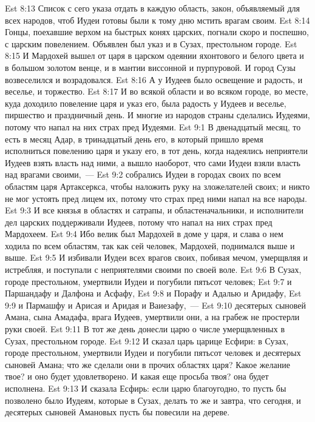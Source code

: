 \vs Est 8:13 Список с сего указа отдать в каждую область,  закон, объявляемый для всех народов, чтоб Иудеи готовы были к тому дню мстить врагам своим.
\vs Est 8:14 Гонцы, поехавшие верхом на быстрых конях царских, погнали скоро и поспешно, с царским повелением. Объявлен был указ и в Сузах, престольном городе.
\vs Est 8:15 И Мардохей вышел от царя в царском одеянии яхонтового и белого цвета и в большом золотом венце, и в мантии виссонной и пурпуровой. И город Сузы возвеселился и возрадовался.
\vs Est 8:16 А у Иудеев было  освещение и радость, и веселье, и торжество.
\vs Est 8:17 И во всякой области и во всяком городе, во  месте, куда  доходило повеление царя и указ его, была радость у Иудеев и веселье, пиршество и праздничный день. И многие из народов страны сделались Иудеями, потому что напал на них страх пред Иудеями.
\vs Est 9:1 В двенадцатый месяц, то есть в месяц Адар, в тринадцатый день его, в который пришло время исполниться повелению царя и указу его, в тот день, когда надеялись неприятели Иудеев взять власть над ними, а вышло наоборот, что сами Иудеи взяли власть над врагами своими,~---
\vs Est 9:2 собрались Иудеи в городах своих по всем областям царя Артаксеркса, чтобы наложить руку на зложелателей своих; и никто не мог устоять пред лицем их, потому что страх пред ними напал на все народы.
\vs Est 9:3 И все князья в областях и сатрапы, и областеначальники, и исполнители дел царских поддерживали Иудеев, потому что напал на них страх пред Мардохеем.
\vs Est 9:4 Ибо велик был Мардохей в доме у царя, и слава о нем ходила по всем областям, так как сей человек, Мардохей, поднимался выше и выше.
\rsbpar\vs Est 9:5 И избивали Иудеи всех врагов своих, побивая мечом, умерщвляя и истребляя, и поступали с неприятелями своими по своей воле.
\vs Est 9:6 В Сузах, городе престольном, умертвили Иудеи и погубили пятьсот человек;
\vs Est 9:7 и Паршандафу и Далфона и Асфафу,
\vs Est 9:8 и Порафу и Адалью и Аридафу,
\vs Est 9:9 и Пармашфу и Арисая и Аридая и Ваиезафу,~---
\vs Est 9:10 десятерых сыновей Амана, сына Амадафа, врага Иудеев, умертвили они, а на грабеж не простерли руки своей.
\vs Est 9:11 В тот же день донесли царю о числе умерщвленных в Сузах, престольном городе.
\vs Est 9:12 И сказал царь царице Есфири: в Сузах, городе престольном, умертвили Иудеи и погубили пятьсот человек и десятерых сыновей Амана; что же сделали они в прочих областях царя? Какое желание твое? и оно будет удовлетворено. И какая еще просьба твоя? она будет исполнена.
\vs Est 9:13 И сказала Есфирь: если царю благоугодно, то пусть бы позволено было Иудеям, которые в Сузах, делать то же и завтра, что сегодня, и десятерых сыновей Амановых пусть бы повесили на дереве.
